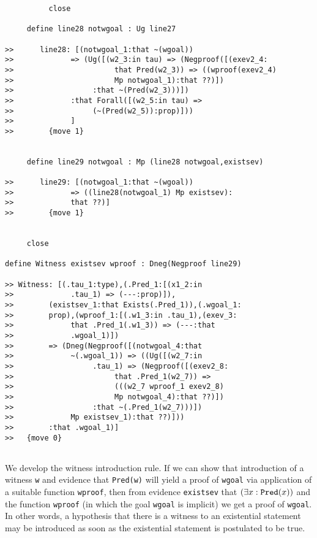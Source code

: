 \documentclass[12pt]{article}
\begin{document}
\begin{verbatim}
          close

     define line28 notwgoal : Ug line27

>>      line28: [(notwgoal_1:that ~(wgoal)) 
>>             => (Ug([(w2_3:in tau) => (Negproof([(exev2_4:
>>                       that Pred(w2_3)) => ((wproof(exev2_4) 
>>                       Mp notwgoal_1):that ??)])
>>                  :that ~(Pred(w2_3)))])
>>             :that Forall([(w2_5:in tau) => 
>>                  (~(Pred(w2_5)):prop)]))
>>             ]
>>        {move 1}


     define line29 notwgoal : Mp (line28 notwgoal,existsev)

>>      line29: [(notwgoal_1:that ~(wgoal)) 
>>             => ((line28(notwgoal_1) Mp existsev):
>>             that ??)]
>>        {move 1}


     close

define Witness existsev wproof : Dneg(Negproof line29)

>> Witness: [(.tau_1:type),(.Pred_1:[(x1_2:in 
>>             .tau_1) => (---:prop)]),
>>        (existsev_1:that Exists(.Pred_1)),(.wgoal_1:
>>        prop),(wproof_1:[(.w1_3:in .tau_1),(exev_3:
>>             that .Pred_1(.w1_3)) => (---:that 
>>             .wgoal_1)])
>>        => (Dneg(Negproof([(notwgoal_4:that 
>>             ~(.wgoal_1)) => ((Ug([(w2_7:in 
>>                  .tau_1) => (Negproof([(exev2_8:
>>                       that .Pred_1(w2_7)) => 
>>                       (((w2_7 wproof_1 exev2_8) 
>>                       Mp notwgoal_4):that ??)])
>>                  :that ~(.Pred_1(w2_7)))])
>>             Mp existsev_1):that ??)]))
>>        :that .wgoal_1)]
>>   {move 0}


\end{verbatim}

We develop the witness introduction rule.  If we can show that introduction of a witness {\tt w} and evidence that {\tt Pred(w)} will yield a proof of {\tt wgoal}
via application of a suitable function {\tt wproof}, then from evidence {\tt existsev} that $(\exists x:{\tt Pred}(x))$  and the function {\tt wproof} (in which the goal {\tt wgoal} is implicit) we
get a proof of {\tt wgoal}.  In other words, a hypothesis that there is a witness to an existential statement may be introduced as soon as the existential statement is postulated to be true.
\end{document}
